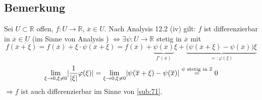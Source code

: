 \subsection[Bemerkung: Vergleich der Differenzierbarkeits-Begriffe]{Bemerkung} %
\label{sub:72}
Sei $U \subset \mathds{R}$ offen, $f : U \to \mathds{R}$, $\overline{x} \in U$. Nach Analysis  12.2 (iv) gilt: $f$ ist differenzierbar in $\overline{x} \in U$ (im
Sinne von Analysis ) $\iff \exists \psi : U  \to \mathds{R}$ stetig in $\overline{x}$ mit 
\[
	f(\overline{x} + \xi) = f(\overline{x} ) + \xi \cdot \psi( \overline{x} + \xi) = f(\overline{x} ) + \underbrace{\psi (\overline{x} )}_{f'(\overline{x} )} \xi + 
	\underbrace{ \big(\psi (\overline{x} + \xi) - \psi (\overline{x} )\big) \xi}_{=: \varphi(\xi)}
\]
\[
	\lim_{ \xi \to 0, \xi \not= 0} \lvert\frac{1}{\lvert\xi\rvert } \varphi (\xi) \rvert  = \lim_{ \xi \to 0, \xi \not= 0} \lvert\psi (\overline{x} + \xi) - \psi (\overline{x} )\rvert
	\stackrel{\text{$\psi$ stetig in $\overline{x} $}}{=} 0
\]
$\Rightarrow f$ ist auch differenzierbar im Sinne von \ref{sub:71}.
